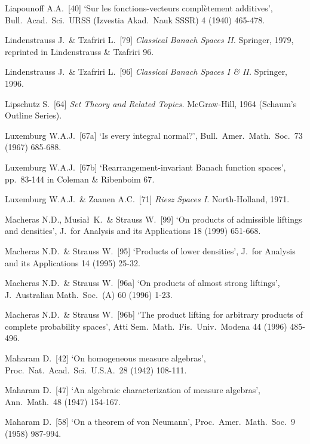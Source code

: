 {Liapounoff A.A.\ [40] `Sur les fonctions-vecteurs compl\`etement
additives', Bull.\ Acad.\ Sci.\ URSS (Izvestia Akad.\ Nauk SSSR) 4 (1940)
465-478.
\cmmnt{[326H.]}

Lindenstrauss J.\ \& Tzafriri L.\ [79] {\it Classical Banach Spaces II.}
Springer, 1979, reprinted in {\smc Lindenstrauss \& Tzafriri 96}.
\cmmnt{[\S354 {\it notes\/}, 374Xj.]}

Lindenstrauss J.\ \& Tzafriri L.\ [96] {\it Classical Banach Spaces I \& II.}  Springer, 1996.

Lipschutz S.\ [64] {\it Set Theory and Related Topics.}  McGraw-Hill,
1964 (Schaum's Outline Series).  \cmmnt{[3A1D.]}

Luxemburg W.A.J.\ [67a] `Is every integral normal?',
Bull.\ Amer.\ Math.\ Soc.\ 73 (1967) 685-688.   \cmmnt{[363S.]}

Luxemburg W.A.J.\ [67b] `Rearrangement-invariant Banach function spaces',
pp.\ 83-144 in {\smc Coleman \& Ribenboim 67}.
\cmmnt{[\S374 {\it notes}.]}

Luxemburg W.A.J.\ \& Zaanen A.C.\ [71] {\it Riesz Spaces
I.} North-Holland, 1971.  

\medskip %

Macheras N.D., Musia\l\ K.\ \& Strauss W.\ [99] `On products of
admissible liftings and densities',
J.\ for Analysis and its Applications 18 (1999) 651-668. \cmmnt{[346G.]}

Macheras N.D.\ \& Strauss W.\ [95] `Products of lower densities', J.\
for Analysis and its Applications 14 (1995) 25-32.  \cmmnt{[346Xf.]}

Macheras N.D.\  \& Strauss W.\ [96a] `On products of almost strong
liftings', J.\ Australian Math.\ Soc.\ (A) 60 (1996) 1-23.
\cmmnt{[346Yc.]}

Macheras N.D.\ \& Strauss W.\ [96b] `The product lifting for arbitrary products of complete
probability spaces', Atti Sem.\ Math.\ Fis.\ Univ.\ Modena 44 (1996) 485-496.
\cmmnt{[346H, 346Yd.]}

Maharam D.\ [42] `On homogeneous measure algebras', Proc.\ Nat.\ Acad.\
Sci.\ U.S.A.\ 28 (1942) 108-111.  \cmmnt{[331F, 332B.]}

Maharam D.\ [47] `An algebraic characterization of measure algebras',
Ann.\ Math.\ 48 (1947) 154-167.
\cmmnt{[393J.]}

Maharam D.\ [58] `On a theorem of von Neumann', Proc.\ Amer.\ Math.\
Soc.\ 9 (1958) 987-994.

}
